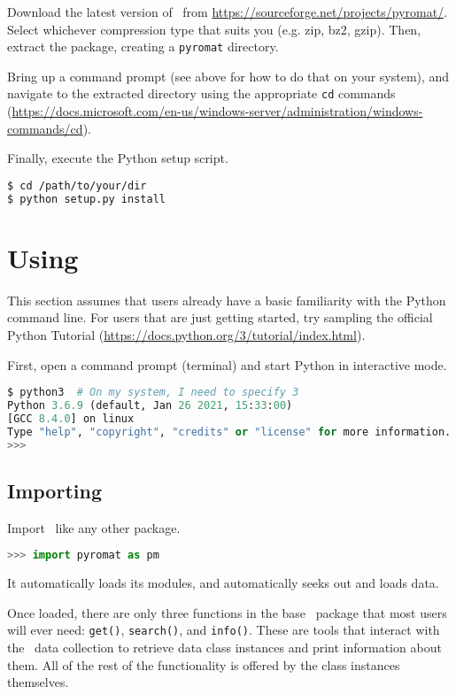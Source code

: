 Download the latest version of \PM\ from \url{https://sourceforge.net/projects/pyromat/}.  Select whichever compression type that suits you (e.g. zip, bz2, gzip).  Then, extract the package, creating a \texttt{pyromat} directory.

Bring up a command prompt (see above for how to do that on your system), and navigate to the extracted directory using the appropriate \texttt{cd} commands (\url{https://docs.microsoft.com/en-us/windows-server/administration/windows-commands/cd}).

Finally, execute the Python setup script.

\begin{lstlisting}[language=bash]
$ cd /path/to/your/dir
$ python setup.py install
\end{lstlisting}

\section{Using \PM }

This section assumes that users already have a basic familiarity with the Python command line.  For users that are just getting started, try sampling the official Python Tutorial (\url{https://docs.python.org/3/tutorial/index.html}).

First, open a command prompt (terminal) and start Python in interactive mode.
\begin{lstlisting}[language=Python]
$ python3  # On my system, I need to specify 3
Python 3.6.9 (default, Jan 26 2021, 15:33:00) 
[GCC 8.4.0] on linux
Type "help", "copyright", "credits" or "license" for more information.
>>> 
\end{lstlisting}

\subsection{Importing}

Import \PM\ like any other package.  
\begin{lstlisting}[language=Python]
>>> import pyromat as pm
\end{lstlisting}
It automatically loads its modules, and automatically seeks out and loads data.

Once loaded, there are only three functions in the base \PM\ package that most users will ever need: \texttt{get()}, \texttt{search()}, and \texttt{info()}.  These are tools that interact with the \PM\ data collection to retrieve data class instances and print information about them.  All of the rest of the functionality is offered by the class instances themselves.

